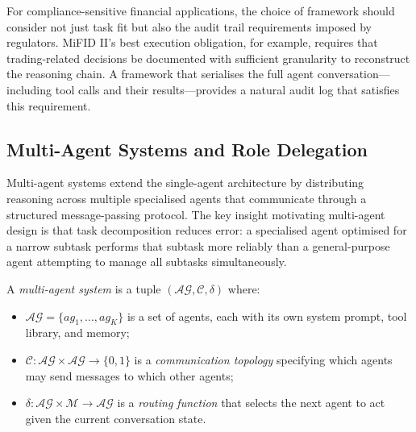 \begin{deepdive}
For compliance-sensitive financial applications, the choice of framework should
consider not just task fit but also the audit trail requirements imposed by regulators.
MiFID II's best execution obligation, for example, requires that trading-related
decisions be documented with sufficient granularity to reconstruct the reasoning
chain. A framework that serialises the full agent conversation---including tool calls
and their results---provides a natural audit log that satisfies this requirement.


\subsection{Multi-Agent Systems and Role Delegation}
\label{subsec:multi-agent}

Multi-agent systems extend the single-agent architecture by distributing reasoning
across multiple specialised agents that communicate through a structured message-passing
protocol. The key insight motivating multi-agent design is that task decomposition
reduces error: a specialised agent optimised for a narrow subtask performs that subtask
more reliably than a general-purpose agent attempting to manage all subtasks
simultaneously.

\begin{definition}
\label{def:multi-agent}
A \emph{multi-agent system} is a tuple $(\mathcal{AG}, \mathcal{C}, \delta)$ where:
\begin{itemize}
  \item $\mathcal{AG} = \{ag_1, \ldots, ag_K\}$ is a set of agents, each with its own
        system prompt, tool library, and memory;
  \item $\mathcal{C}: \mathcal{AG} \times \mathcal{AG} \to \{0,1\}$ is a
        \emph{communication topology} specifying which agents may send messages to
        which other agents;
  \item $\delta: \mathcal{AG} \times \mathcal{M} \to \mathcal{AG}$ is a
        \emph{routing function} that selects the next agent to act given the
        current conversation state.
\end{itemize}
\end{definition}


\end{deepdive}
